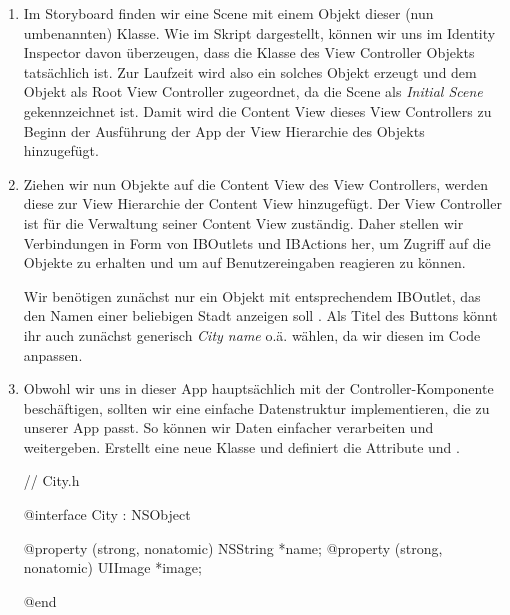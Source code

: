 \documentclass[parskip=half, final]{scrreprt}
\begin{document}
\begin{lecture}
\begin{enumerate}

\item Im Storyboard finden wir eine Scene mit einem Objekt dieser (nun umbenannten)  Klasse. Wie im Skript dargestellt, können wir uns im Identity Inspector davon überzeugen, dass die Klasse des View Controller Objekts tatsächlich  ist. Zur Laufzeit wird also ein solches Objekt erzeugt und dem  Objekt als Root View Controller zugeordnet, da die Scene als \emph{Initial Scene} gekennzeichnet ist. Damit wird die Content View dieses View Controllers zu Beginn der Ausführung der App der View Hierarchie des  Objekts hinzugefügt.

\item Ziehen wir nun  Objekte auf die Content View des View Controllers, werden diese zur View Hierarchie der Content View hinzugefügt. Der View Controller ist für die Verwaltung seiner Content View zuständig. Daher stellen wir Verbindungen in Form von IBOutlets und IBActions her, um Zugriff auf die Objekte zu erhalten und um auf Benutzereingaben reagieren zu können.

Wir benötigen zunächst nur ein  Objekt mit entsprechendem IBOutlet, das den Namen einer beliebigen Stadt anzeigen soll . Als Titel des Buttons könnt ihr auch zunächst generisch \emph{City name} o.ä. wählen, da wir diesen im Code anpassen.


\item Obwohl wir uns in dieser App hauptsächlich mit der Controller-Komponente beschäftigen, sollten wir eine einfache Datenstruktur implementieren, die zu unserer App passt. So können wir Daten einfacher verarbeiten und weitergeben. Erstellt eine neue Klasse  und definiert die Attribute  und .

\begin{objclst}
// City.h

@interface City : NSObject

@property (strong, nonatomic) NSString *name;
@property (strong, nonatomic) UIImage *image;

@end
\end{objclst}


\end{enumerate}
\end{lecture}
\end{document}
